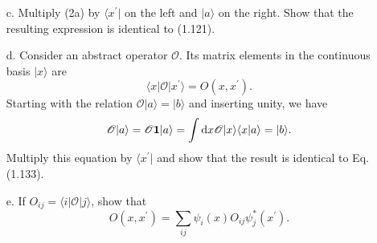 \documentclass[a4paper]{book}
\newcounter{exercise}[chapter]
\newcommand*{\dif}{\mathop{}\!\mathrm{d}}
\newcommand{\I}{{\bf 1}}
\begin{document}
\begin{exercise}
\begin{enumerate}
	\item[c.] Multiply (2a) by $\langle x^\prime |$ on the left and $| a \rangle$ on the right. Show that the resulting expression is identical to (1.121).
	
	\item[d.] Consider an abstract operator $\mathscr{O}$. Its matrix elements in the continuous basis $| x \rangle$ are
	\begin{equation*}
		\langle x | \mathscr{O} | x^\prime \rangle = O(x,x^\prime).
	\end{equation*}
	Starting with the relation $\mathscr{O}| a \rangle = | b \rangle$ and inserting unity, we have
	\begin{equation*}
		\mathscr{O} | a \rangle = \mathscr{O} \I | a \rangle = \int \dif x \mathscr{O} | x \rangle \langle x | a \rangle = | b \rangle .
	\end{equation*}
	Multiply this equation by $\langle x^\prime |$ and show that the result is identical to Eq.(1.133).
	
	\item[e.] If $O_{ij} = \langle i | \mathscr{O} | j \rangle$, show that
	\begin{equation*}
		O(x,x^\prime) = \sum_{ij} \psi_i(x) O_{ij} \psi^*_j(x^\prime).
	\end{equation*}
	
	\end{enumerate}

	\end{exercise}
	
\end{document}
